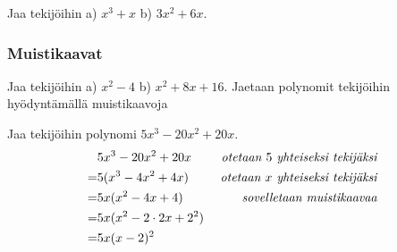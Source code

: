 \begin{esimerkki}
Jaa tekijöihin \quad a) $x^3+x$ \quad b) $3x^2+6x.$
\begin{alakohdat}
\end{alakohdat}
\end{esimerkki}

\subsubsection*{Muistikaavat}

\begin{esimerkki}
Jaa tekijöihin \quad a) $x^2-4$ \quad b) $x^2+8x+16.$
Jaetaan polynomit tekijöihin hyödyntämällä muistikaavoja
\begin{alakohdat}
\end{alakohdat}
\end{esimerkki}

\begin{esimerkki}
Jaa tekijöihin polynomi $5x^3-20x^2+20x$.
\begin{align*}
& 5x^3-20x^2+20x \ \ \ \ &\emph{otetaan $5$ yhteiseksi tekijäksi}\\
=& 5(x^3-4x^2+4x)&\emph{otetaan $x$ yhteiseksi tekijäksi}  \\
=& 5x(x^2-4x+4) &\emph{sovelletaan muistikaavaa} \\
=& 5x(x^2-2\cdot 2x+2^2)  \\
=& 5x(x-2)^2
\end{align*}
\end{esimerkki}




